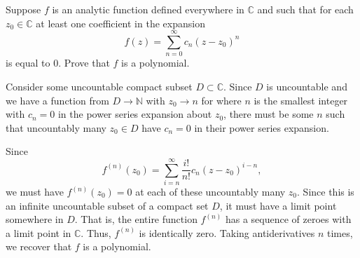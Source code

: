 \documentclass[12 pt, letterpaper]{hmcpset}
\begin{document}
\pagebreak

\begin{problem}[13.]
	Suppose $f$ is an analytic function defined everywhere in $\mathbb{C}$ and such that for each $z_{0} \in \mathbb{C}$ at least one coefficient in the expansion
	\[
		f(z) = \sum_{n = 0}^{\infty} c_{n} (z - z_{0})^{n}
	\]
	is equal to $0$. Prove that $f$ is a polynomial.
\end{problem}

\begin{solution}
	Consider some uncountable compact subset $D \subset \mathbb{C}$. Since $D$ is uncountable and we have a function from $D \to \mathbb{N}$ with $z_{0} \to n$ for where $n$ is the smallest integer with $c_{n} = 0$ in the power series expansion about $z_{0}$, there must be some $n$ such that uncountably many $z_{0} \in D$ have $c_{n} = 0$ in their power series expansion. 

	Since
	\[
		f^{(n)}(z_{0}) = \sum_{i = n}^{\infty} \frac{i!}{n!} c_{n} (z - z_{0})^{i - n},
	\]
	we must have $f^{(n)}(z_{0}) = 0$ at each of these uncountably many $z_{0}$. Since this is an infinite uncountable subset of a compact set $D$, it must have a limit point somewhere in $D$. That is, the  entire function  $f^{(n)}$ has a sequence of zeroes with a limit point in $\mathbb{C}$. Thus, $f^{(n)}$ is identically zero. Taking antiderivatives $n$ times, we recover that $f$ is a polynomial.
\end{solution}
\end{document}
